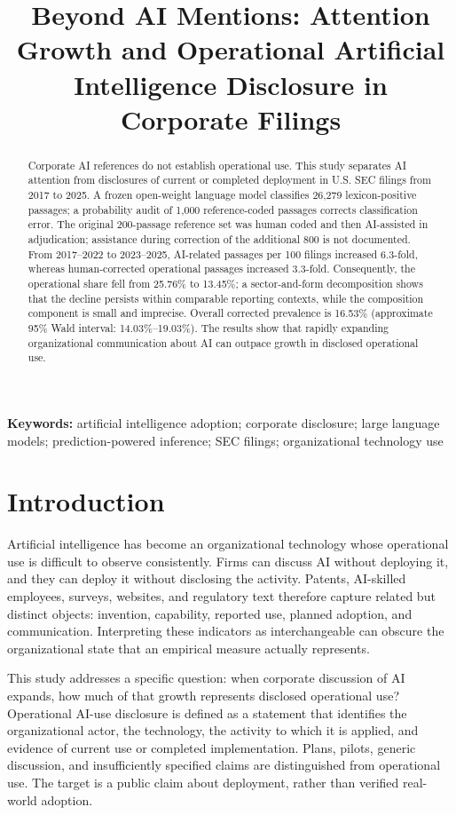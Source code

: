 \documentclass[12pt]{article}
\title{Beyond AI Mentions: Attention Growth and Operational Artificial
Intelligence Disclosure in Corporate Filings}
\author{}
\date{}
\begin{document}
\maketitle
\thispagestyle{plain}


\begin{abstract}
Corporate AI references do not establish operational use. This study separates
AI attention from disclosures of current or completed deployment in U.S. SEC
filings from 2017 to 2025. A frozen open-weight language model classifies
26,279 lexicon-positive passages; a probability audit of 1,000 reference-coded
passages corrects classification error. The original 200-passage reference
set was human coded and then AI-assisted in adjudication; assistance during
correction of the additional 800 is not documented. From 2017--2022 to 2023--2025,
AI-related passages per 100 filings increased 6.3-fold, whereas
human-corrected operational passages increased 3.3-fold. Consequently, the
operational share fell from 25.76\% to 13.45\%; a sector-and-form decomposition
shows that the decline persists within comparable reporting contexts, while
the composition component is small and imprecise. Overall corrected
prevalence is 16.53\% (approximate 95\% Wald interval: 14.03\%--19.03\%).
The results show that rapidly expanding organizational communication about AI
can outpace growth in disclosed operational use.
\end{abstract}


\noindent\textbf{Keywords:} artificial intelligence adoption; corporate
disclosure; large language models; prediction-powered inference; SEC filings;
organizational technology use

\section{Introduction}

Artificial intelligence has become an organizational technology whose
operational use is difficult to observe consistently. Firms can discuss AI
without deploying it, and they can deploy it without disclosing the activity.
Patents, AI-skilled employees, surveys, websites, and regulatory text therefore
capture related but distinct objects: invention, capability, reported use,
planned adoption, and communication. Interpreting these indicators as
interchangeable can obscure the organizational state that an empirical
measure actually represents.

This study addresses a specific question: when corporate discussion of AI
expands, how much of that growth represents disclosed operational use?
Operational AI-use disclosure is defined as a statement that identifies the
organizational actor, the technology, the activity to which it is applied, and
evidence of current use or completed implementation. Plans, pilots, generic
discussion, and insufficiently specified claims are distinguished from
operational use. The target is a public claim about deployment, rather than
verified real-world adoption.
\end{document}

